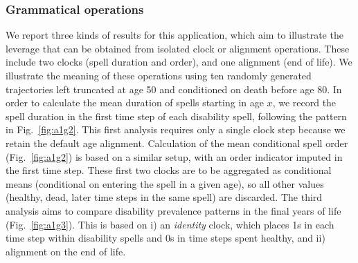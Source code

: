 \documentclass[a4paper,left=1.25cm,right=1.25cm,top=1.25cm,bottom=1.25cm]{article}
\begin{document}
\subsubsection{Grammatical operations}
We report three kinds of results for this application, which aim to illustrate the leverage that can be obtained from isolated clock or alignment operations. These include two clocks (spell duration and order), and one alignment (end of life). We illustrate the meaning of these operations using ten randomly generated trajectories left truncated at age 50 and conditioned on death before age 80. In order to calculate the mean duration of spells starting in age $x$, we record the spell duration in the first time step of each disability spell, following the pattern in Fig.~\ref{fig:a1g2}. This first analysis requires only a single clock step because we retain the default age alignment. Calculation of the mean conditional spell order (Fig.~\ref{fig:a1g2}) is based on a similar setup, with an order indicator imputed in the first time step. These first two clocks are to be aggregated as conditional means (conditional on entering the spell in a given age), so all other values (healthy, dead, later time steps in the same spell) are discarded. The third analysis aims to compare disability prevalence patterns in the final years of life (Fig.~\ref{fig:a1g3}). This is based on i) an \emph{identity} clock, which places 1s in each time step within disability spells and 0s in time steps spent healthy, and ii) alignment on the end of life.
\end{document}
